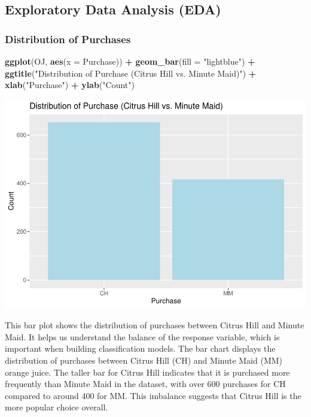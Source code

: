 \documentclass[
]{article}
\newenvironment{Shaded}{\begin{snugshade}}{\end{snugshade}}
\newcommand{\AttributeTok}[1]{\textcolor[rgb]{0.13,0.29,0.53}{#1}}
\newcommand{\FunctionTok}[1]{\textcolor[rgb]{0.13,0.29,0.53}{\textbf{#1}}}
\newcommand{\NormalTok}[1]{#1}
\newcommand{\SpecialCharTok}[1]{\textcolor[rgb]{0.81,0.36,0.00}{\textbf{#1}}}
\newcommand{\StringTok}[1]{\textcolor[rgb]{0.31,0.60,0.02}{#1}}
\begin{document}
\hypertarget{exploratory-data-analysis-eda}{%
\subsection{Exploratory Data Analysis
(EDA)}\label{exploratory-data-analysis-eda}}

\hypertarget{distribution-of-purchases}{%
\subsubsection{Distribution of
Purchases}\label{distribution-of-purchases}}

\begin{Shaded}
\begin{Highlighting}[]
\FunctionTok{ggplot}\NormalTok{(OJ, }\FunctionTok{aes}\NormalTok{(}\AttributeTok{x =}\NormalTok{ Purchase)) }\SpecialCharTok{+}
  \FunctionTok{geom\_bar}\NormalTok{(}\AttributeTok{fill =} \StringTok{"lightblue"}\NormalTok{) }\SpecialCharTok{+}
  \FunctionTok{ggtitle}\NormalTok{(}\StringTok{"Distribution of Purchase (Citrus Hill vs. Minute Maid)"}\NormalTok{) }\SpecialCharTok{+}
  \FunctionTok{xlab}\NormalTok{(}\StringTok{"Purchase"}\NormalTok{) }\SpecialCharTok{+} \FunctionTok{ylab}\NormalTok{(}\StringTok{"Count"}\NormalTok{)}
\end{Highlighting}
\end{Shaded}

\includegraphics{OJ_files/figure-latex/unnamed-chunk-3-1.pdf}

This bar plot shows the distribution of purchases between Citrus Hill
and Minute Maid. It helps us understand the balance of the response
variable, which is important when building classification models. The
bar chart displays the distribution of purchases between Citrus Hill
(CH) and Minute Maid (MM) orange juice. The taller bar for Citrus Hill
indicates that it is purchased more frequently than Minute Maid in the
dataset, with over 600 purchases for CH compared to around 400 for MM.
This imbalance suggests that Citrus Hill is the more popular choice
overall.
\end{document}
